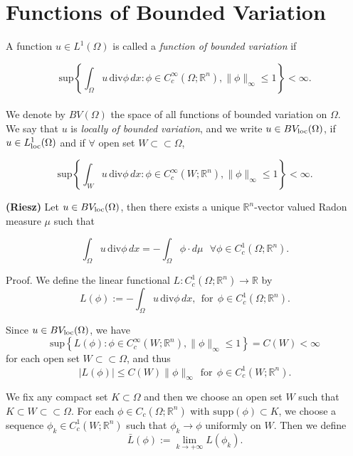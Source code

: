 \section{Functions of Bounded Variation}

\begin{definition} A function $u \in L^{1}(\Omega)$ is called a {\em function of bounded variation} if

\[ \mathrm{sup}\left \{ \int_{\Omega} u\, \mathrm{div}\phi\, dx : \phi \in C_{c}^{\infty}(\Omega; \mathbb{R}^{n}), \|\phi\|_{\infty} \le 1 \right \} < \infty. \]
\\
We denote by $BV(\Omega)$ the space of all functions of bounded variation on $\Omega$.
\\
We say that $u$ is {\em locally of bounded variation}, and we write $u \in BV_{\rm loc}(\Omega)$, if $u \in L^{1}_{\rm loc}(\Omega)$ and if $\forall$ open set $W \subset \subset \Omega$,

\[ \mathrm{sup}\left \{ \int_{W} u\, \mathrm{div}\phi\, dx : \phi \in C_{c}^{\infty}(W; \mathbb{R}^{n}), \|\phi\|_{\infty} \le 1 \right \} < \infty. \] 
\end{definition}

\begin{theorem} \label{RieszBV} {\bf (Riesz)} Let $u \in BV_{\rm loc}(\Omega)$, then there exists a unique $\mathbb{R}^{n}$-vector valued Radon measure $\mu$ such that

\[ \int_{\Omega} u\, \mathrm{div}\phi\,dx = - \int_{\Omega} \phi \cdot d\mu   \   \  \ \forall \phi \in C_{c}^{1}(\Omega; \mathbb{R}^{n}). \]
\end{theorem}
Proof. We define the linear functional $L : C_{c}^{1}(\Omega; \mathbb{R}^{n}) \to \mathbb{R}$ by
\[ L(\phi) := -\int_{\Omega} u\, \mathrm{div}\phi \,dx, \ \ \text{for} \ \ \phi \in C_{c}^{1}(\Omega; \mathbb{R}^{n}). \]

Since $u \in BV_{\rm loc}(\Omega)$, we have
\[ \mathrm{sup}\left \{ L(\phi) : \phi \in C_{c}^{\infty}(W; \mathbb{R}^{n}), \|\phi\|_{\infty} \le 1 \right \} = C(W) < \infty\]
for each open set $W \subset \subset \Omega$, and thus
\[ |L(\phi)| \le C(W) \|\phi\|_{\infty} \  \ \text{for} \  \ \phi \in C^{1}_{c}(W ; \mathbb{R}^{n}). \]

We fix any compact set $K \subset \Omega$ and then we choose an open set $W$ such that $K \subset W \subset \subset \Omega$. For each $\phi \in C_{c}(\Omega ; \mathbb{R}^{n})$ with $\mathrm{supp}(\phi) \subset K$, we choose a sequence $\phi_{k} \in C^{1}_{c}(W ; \mathbb{R}^{n})$ such that $\phi_{k} \to \phi$ uniformly on $W$. Then we define
\[ \bar L(\phi) := \lim_{k \to +\infty} L(\phi_{k}). \]

